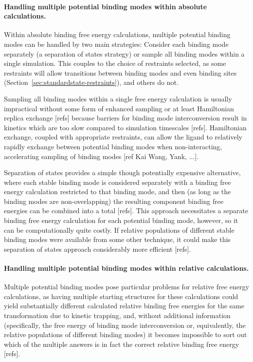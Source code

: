 \documentclass[9pt,bestpractices]{livecoms}
\begin{document}
\paragraph{Handling multiple potential binding modes within absolute calculations.}
Within absolute binding free energy calculations, multiple potential binding modes can be handled by two main strategies: Consider each binding mode separately (a separation of states strategy) or sample all binding modes within a single simulation.
This couples to the choice of restraints selected, as some restraints will allow transitions between binding modes and even binding sites (Section~\ref{sec:standardstate-restraints}), and others do not.

Sampling all binding modes within a single free energy calculation is usually impractical without some form of enhanced sampling or at least Hamiltonian replica exchange [refs] because barriers for binding mode interconversion result in kinetics which are too slow compared to simulation timescales [refs].
Hamiltonian exchange, coupled with appropriate restraints, can allow the ligand to relatively rapidly exchange between potential binding modes when non-interacting, accelerating sampling of binding modes [ref Kai Wang, Yank, ...].

Separation of states provides a simple though potentially expensive alternative, where each stable binding mode is considered separately with a binding free energy calculation restricted to that binding mode, and then (as long as the binding modes are non-overlapping) the resulting component binding free energies can be combined into a total [refs].
This approach necessitates a separate binding free energy calculation for each potential binding mode, however, so it can be computationally quite costly.
If relative populations of different stable binding modes were available from some other technique, it could make this separation of states approach considerably more efficient [refs].

\paragraph{Handling multiple potential binding modes within relative calculations.}

Multiple potential binding modes pose particular problems for relative free energy calculations, as having multiple starting structures for these calculations could yield substantially different calculated relative binding free energies for the same transformation due to kinetic trapping, and, without additional information (specifically, the free energy of binding mode interconversion or, equivalently, the relative populations of different binding modes) it becomes impossible to sort out which of the multiple answers is in fact the correct relative binding free energy [refs].
\end{document}
